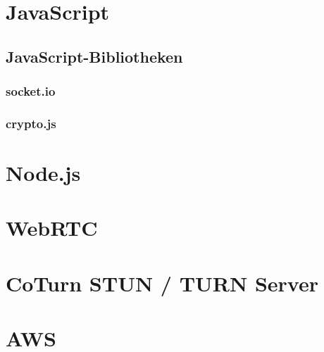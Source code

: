 \section{JavaScript}
\subsection{JavaScript-Bibliotheken}
\subsubsection{socket.io}
\subsubsection{crypto.js}

\section{Node.js}

\section{WebRTC}

\section{CoTurn STUN / TURN Server}

\section{AWS}